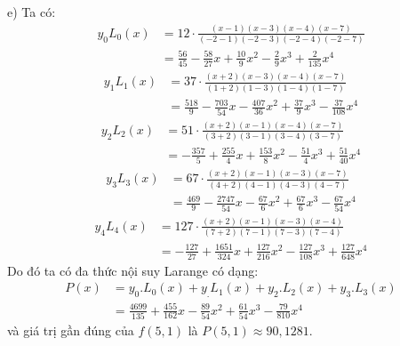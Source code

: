 e) Ta có:
\begin{align*}
	y_0L_0(x)	& =12\cdot\frac{(x-1)(x-3)(x-4)(x-7)}{(-2-1)(-2-3)(-2-4)(-2-7)}\\
				& =\frac{56}{45}-\frac{58}{27}x+\frac{10}{9}x^2-\frac{2}{9}x^3+\frac{2}{135}x^4
\end{align*}
\begin{align*}
	y_1L_1(x)	& =37\cdot\frac{(x+2)(x-3)(x-4)(x-7)}{(1+2)(1-3)(1-4)(1-7)}\\
				& =\frac{518}{9}-\frac{703}{54}x-\frac{407}{36}x^2+\frac{37}{9}x^3-\frac{37}{108}x^4
\end{align*}
\begin{align*}
	y_2L_2(x)	& =51\cdot\frac{(x+2)(x-1)(x-4)(x-7)}{(3+2)(3-1)(3-4)(3-7)}\\
				& =-\frac{357}{5}+\frac{255}{4}x+\frac{153}{8}x^2-\frac{51}{4}x^3+\frac{51}{40}x^4
\end{align*}
\begin{align*}
	y_3L_3(x)	&=67\cdot\frac{(x+2)(x-1)(x-3)(x-7)}{(4+2)(4-1)(4-3)(4-7)}\\
				&=\frac{469}{9}-\frac{2747}{54}x-\frac{67}{6}x^2+\frac{67}{6}x^3-\frac{67}{54}x^4
\end{align*}
\begin{align*}
	y_4L_4(x)	& =127\cdot\frac{(x+2)(x-1)(x-3)(x-4)}{(7+2)(7-1)(7-3)(7-4)}\\
				& =-\frac{127}{27}+\frac{1651}{324}x+\frac{127}{216}x^2-\frac{127}{108}x^3+\frac{127}{648}x^4
\end{align*}
Do đó ta có đa thức nội suy Larange có dạng:
\begin{align*}
	P(x)	& =y_0.L_0(x)+y_.L_1(x)+y_2.L_2(x)+y_3.L_3(x)\\
			& =\frac{4699}{135} + \frac{455}{162}x - \frac{89}{54}x^2 + \frac{61}{54}x^3 - \frac{79}{810}x^4
\end{align*}
và giá trị gần đúng của $f(5,1)$ là $P(5,1)\approx 90,1281$.
